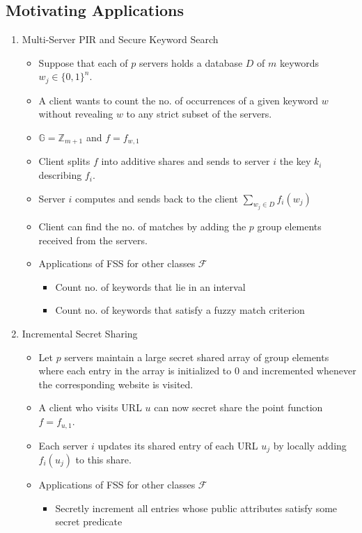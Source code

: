 \subsection{Motivating Applications}
\begin{enumerate}
    \item Multi-Server PIR and Secure Keyword Search
    \begin{itemize}
        \item Suppose that each of $p$ servers holds a database $D$ of $m$ keywords $w_j \in \{0, 1\}^n$.
        \item A client wants to count the no. of occurrences of a given keyword $w$ without revealing $w$ to any strict subset of the servers.
        \item $\mathbb{G} = \mathbb{Z}_{m+1}$ and $f = f_{w, 1}$
        \item Client splits $f$ into additive shares and sends to server $i$ the key $k_i$ describing $f_i$.
        \item Server $i$ computes and sends back to the client $\sum_{w_j \in D}f_i(w_j)$
        \item Client can find the no. of matches by adding the $p$ group elements received from the servers.
        \item Applications of FSS for other classes $\mathcal{F}$
        \begin{itemize}
            \item Count no. of keywords that lie in an interval
            \item Count no. of keywords that satisfy a fuzzy match criterion
        \end{itemize}
    \end{itemize}
    \item Incremental Secret Sharing
    \begin{itemize}
        \item Let $p$ servers maintain a large secret shared array of group elements where each entry in the array is initialized to 0 and incremented whenever the corresponding website is visited.
        \item A client who visits URL $u$ can now secret share the point function $f = f_{u, 1}$.
        \item Each server $i$ updates its shared entry of each URL $u_j$ by locally adding $f_i(u_j)$ to this share.
        \item Applications of FSS for other classes $\mathcal{F}$
        \begin{itemize}
            \item Secretly increment all entries whose public attributes satisfy some secret predicate 
        \end{itemize}
    \end{itemize}
\end{enumerate}

